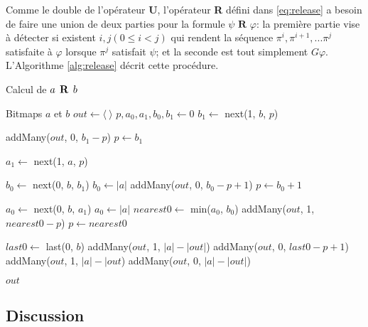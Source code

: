 Comme le double de l'opérateur \textbf{U}, l'opérateur \textbf{R} défini dans \eqref{eq:release} a besoin de faire une union de deux parties pour la formule $\psi \textbf{ R } \varphi$: la première partie vise à détecter si existent $i, j (0 \leq i < j) $ qui rendent la séquence $\pi^i, \pi^{i + 1}, ... \pi^j $ satisfaite à $\varphi$ lorsque $\pi^j$ satisfait $\psi$; et la seconde est tout simplement $G\varphi$. L'Algorithme \ref{alg:release} décrit cette procédure.

\begin{algorithm}
\caption{Calcul de $a \mathrel{\mbox{\,\textbf{R}}}\, b$}
\label{alg:release}
\begin{multicols}{2}
\begin{algorithmic}[1]
\Require Bitmaps $a$ et $b$
\State $out \gets \langle~\rangle$
\State $p, a_0, a_1, b_0, b_1 \gets 0$
    \State $b_1 \gets$ next(1, $b$, $p$)
  \EndIf
    \BreakWhile
  \EndIf

    \State addMany($out$, 0, $b_1 - p$)
    \State $p \gets b_1$
    \Continue
  \EndIf

    \State $a_1 \gets$ next(1, $a$, $p$)
  \EndIf
    \BreakWhile
  \EndIf

    \State $b_0 \gets$ next(0, $b$, $b_1$)
      \State $b_0 \gets |a|$
    \EndIf
  \EndIf
    \State addMany($out$, 0, $b_0 - p + 1$)
    \State $p \gets b_0 + 1$
    \Continue
  \EndIf

    \State $a_0 \gets$ next(0, $b$, $a_1$)
      \State $a_0 \gets |a|$
    \EndIf
  \EndIf
  \State $nearest0 \gets$ min($a_0$, $b_0$)
  \State addMany($out$, 1, $nearest0 - p$)
  \State $p \gets nearest0$
\EndWhile

  \State $last0 \gets$ last(0, $b$)
    \State addMany($out$, 1, $|a| - |out|$)
  \Else
    \State addMany($out$, 0, $last0 - p + 1$)
    \State addMany($out$, 1, $|a| - |out$)
  \EndIf
\Else
  \State addMany($out$, 0, $|a| - |out|$)
\EndIf

\State \Return $out$
\end{algorithmic}
\end{multicols}
\end{algorithm}

\subsection{Discussion}

